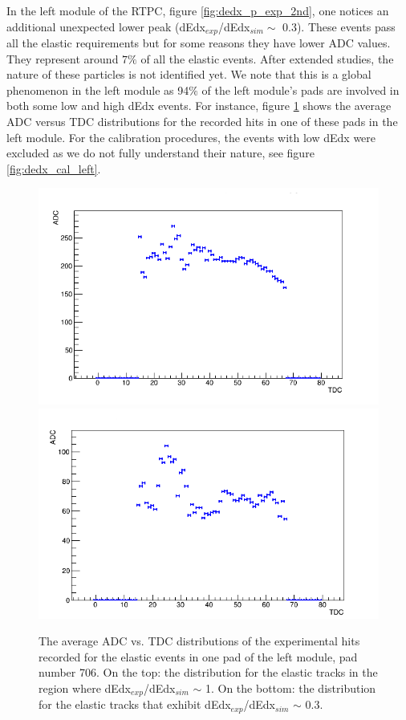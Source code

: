 In the left module of the RTPC, figure \ref{fig:dedx_p_exp_2nd}, one notices an 
additional unexpected lower peak (dEdx$_{exp}$/dEdx$_{sim} \sim$ 0.3). These 
events pass all the elastic requirements but for some reasons they have lower 
ADC values. They represent around $7\%$ of all the elastic events. After 
extended studies, the nature of these particles is not identified yet. We note 
that this is a global phenomenon in the left module as 94$\%$ of the left 
module's pads are involved in both some low and high dEdx events. For instance, 
figure \ref{fig:Chann_706} shows the average ADC versus TDC distributions for 
the recorded hits in one of these pads in the left module. For the calibration 
procedures, the events with low dEdx were excluded as we do not fully 
understand their nature, see figure \ref{fig:dedx_cal_left}.\\
\begin{figure}[tbp]
\centering
\includegraphics[scale=0.4]{fig_rtpc/Chan_706_1.png}
\includegraphics[scale=0.4]{fig_rtpc/Chan_706_2.png}
\caption{The average ADC vs. TDC distributions of the experimental hits 
   recorded for the elastic events in one pad of the left module, pad number 
   706.  On the top: the distribution for the elastic tracks in the region 
   where dEdx$_{exp}$/dEdx$_{sim} $ $\sim$ 1. On the bottom: the distribution 
for the elastic tracks that exhibit dEdx$_{exp}$/dEdx$_{sim} $ $\sim$ 0.3.}
\label{fig:Chann_706}
\end{figure}

